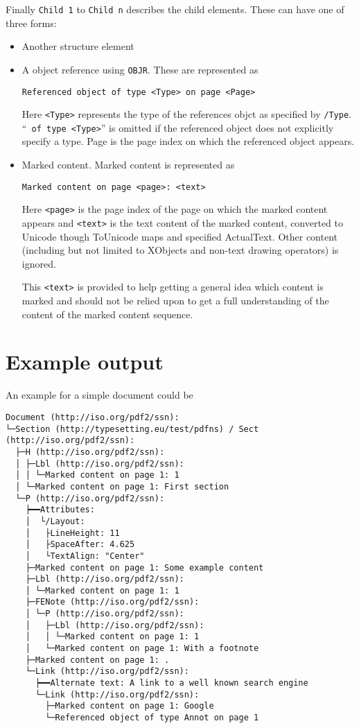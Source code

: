 \documentclass[8pt,a4paper]{article}
\begin{document}
Finally \texttt{Child 1} to \texttt{Child n} describes the child elements. These can have one of three forms:
\begin{itemize}
  \item Another structure element
  \item A object reference using \texttt{OBJR}. These are represented as
    \begin{verbatim}
Referenced object of type <Type> on page <Page>
    \end{verbatim}

    Here \texttt{<Type>} represents the type of the references objct as specified by \texttt{/Type}. \enquote{\texttt{ of type <Type>}} is omitted if the referenced object does not explicitly specify a type.
    Page is the page index on which the referenced object appears.
  \item Marked content. Marked content is represented as
    \begin{verbatim}
Marked content on page <page>: <text>
    \end{verbatim}
    Here \texttt{<page>} is the page index of the page on which the marked content appears and \texttt{<text>} is the text content of the marked content, converted to Unicode though ToUnicode maps and specified ActualText. Other content (including but not limited to XObjects and non-text drawing operators) is ignored.

    This \texttt{<text>} is provided to help getting a general idea which content is marked and should not be relied upon to get a full understanding of the content of the marked content sequence.
\end{itemize}

\section{Example output}
An example for a simple document could be
\begin{verbatim}
Document (http://iso.org/pdf2/ssn):
└─Section (http://typesetting.eu/test/pdfns) / Sect (http://iso.org/pdf2/ssn):
  ├─H (http://iso.org/pdf2/ssn):
  │ ├─Lbl (http://iso.org/pdf2/ssn):
  │ │ └─Marked content on page 1: 1
  │ └─Marked content on page 1: First section
  └─P (http://iso.org/pdf2/ssn):
    ┝━━Attributes:
    │  └/Layout:
    │   ├LineHeight: 11
    │   ├SpaceAfter: 4.625
    │   └TextAlign: "Center"
    ├─Marked content on page 1: Some example content
    ├─Lbl (http://iso.org/pdf2/ssn):
    │ └─Marked content on page 1: 1
    ├─FENote (http://iso.org/pdf2/ssn):
    │ └─P (http://iso.org/pdf2/ssn):
    │   ├─Lbl (http://iso.org/pdf2/ssn):
    │   │ └─Marked content on page 1: 1
    │   └─Marked content on page 1: With a footnote
    ├─Marked content on page 1: .
    └─Link (http://iso.org/pdf2/ssn):
      ┝━━Alternate text: A link to a well known search engine
      └─Link (http://iso.org/pdf2/ssn):
        ├─Marked content on page 1: Google
        └─Referenced object of type Annot on page 1
\end{verbatim}
\end{document}
